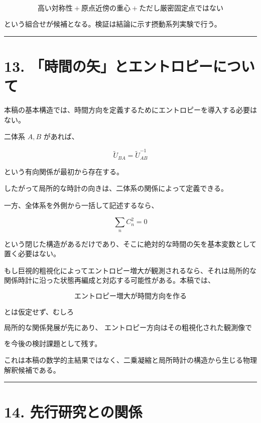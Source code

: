 \documentclass[
  a4paper,
]{ltjsarticle}
\begin{document}
\[
\boxed{
\text{高い対称性}
+
\text{原点近傍の重心}
+
\text{ただし厳密固定点ではない}
}
\]

という組合せが候補となる。検証は結論に示す摂動系列実験で行う。

\begin{center}\rule{0.5\linewidth}{0.5pt}\end{center}

\section{13.
「時間の矢」とエントロピーについて}\label{ux6642ux9593ux306eux77e2ux3068ux30a8ux30f3ux30c8ux30edux30d4ux30fcux306bux3064ux3044ux3066}

本稿の基本構造では、時間方向を定義するためにエントロピーを導入する必要はない。

二体系 \(A,B\) があれば、

\[
\tilde U_{BA}
=
\tilde U_{AB}^{-1}
\]

という有向関係が最初から存在する。

したがって局所的な時計の向きは、二体系の関係によって定義できる。

一方、全体系を外側から一括して記述するなら、

\[
\sum_nC_n^2=0
\]

という閉じた構造があるだけであり、そこに絶対的な時間の矢を基本変数として置く必要はない。

もし巨視的粗視化によってエントロピー増大が観測されるなら、それは局所的な関係時計に沿った状態再編成と対応する可能性がある。本稿では、

\[
\boxed{
\text{エントロピー増大が時間方向を作る}
}
\]

とは仮定せず、むしろ

\[
\boxed{
\text{局所的な関係発展が先にあり、
エントロピー方向はその粗視化された観測像である可能性}
}
\]

を今後の検討課題として残す。

これは本稿の数学的主結果ではなく、二乗凝縮と局所時計の構造から生じる物理解釈候補である。

\begin{center}\rule{0.5\linewidth}{0.5pt}\end{center}

\section{14.
先行研究との関係}\label{ux5148ux884cux7814ux7a76ux3068ux306eux95a2ux4fc2}
\end{document}
